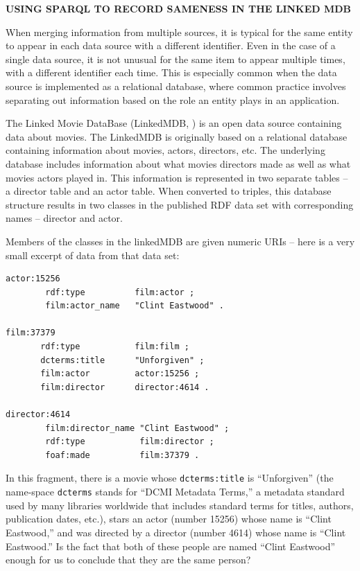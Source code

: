 \begin{challenge} 
\textbf{USING SPARQL TO RECORD SAMENESS IN THE LINKED MDB}
\label{chal:3}

When merging information from multiple sources, it is typical for the
same entity to appear in each data source with a different identifier.
Even in the case of a single data source, it is not unusual for the same
item to appear multiple times, with a different identifier each time.
This is especially common when the data source is implemented as a
relational database, where common practice involves separating out
information based on the role an entity plays in an application.

The Linked Movie DataBase (LinkedMDB, \cite{lmdatabase}) is an open data source containing
data about movies. The LinkedMDB is originally based on a relational database
containing information about movies, actors, directors, etc. The
underlying database includes information about what movies directors
made as well as what movies actors played in. This information is
represented in two separate tables -- a director table and an actor
table. When converted to triples, this database structure results in two
classes in the published RDF data set with corresponding names --
director and actor.

Members of the classes in the linkedMDB are given numeric URIs -- here
is a very small excerpt of data from that data set:

\begin{lstlisting}
actor:15256 
        rdf:type          film:actor ;
        film:actor_name   "Clint Eastwood" .

film:37379
       rdf:type           film:film ;
       dcterms:title      "Unforgiven" ;
       film:actor         actor:15256 ;
       film:director      director:4614 .

director:4614  
        film:director_name "Clint Eastwood" ;
        rdf:type           film:director ;
        foaf:made          film:37379 .

\end{lstlisting}

In this fragment, there is a movie whose \texttt{dcterms:title} is ``Unforgiven'' (the
name-space \texttt{dcterms} stands for ``DCMI Metadata Terms,'' a metadata standard used by
many libraries worldwide that includes standard terms for titles,
authors, publication dates, etc.), stars an actor (number 15256) whose
name is ``Clint Eastwood,'' and was directed by a director (number 4614)
whose name is ``Clint Eastwood.'' Is the fact that both of these people
are named ``Clint Eastwood'' enough for us to conclude that they are the
same person?


\end{challenge}
